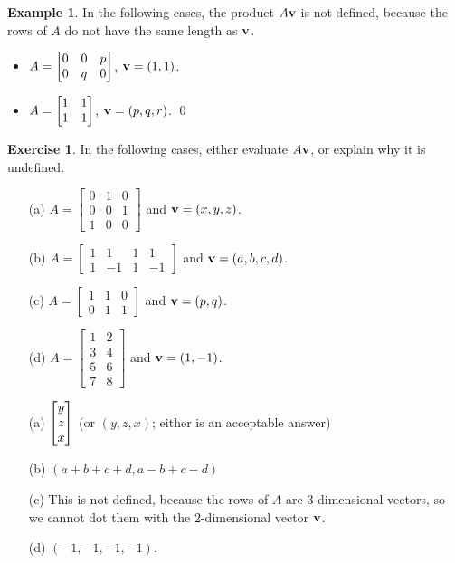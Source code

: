 \documentclass[a4paper]{book}
\theoremstyle{definition}
\newtheorem{example}[theorem]{Example}
\newtheorem{exercise}[theorem]{Exercise}
\renewenvironment{solution}{\SolutionInline}{\endSolutionInline}
\begin{document}
\begin{example}
 In the following cases, the product $A\mathbf{v}$ is not defined,
 because the rows of $A$ do not have the same length as $\mathbf{v}$.
 \begin{itemize}
  \item $A=\begin{bmatrix} 0&0&p \\ 0&q&0 \end{bmatrix}$,
    $\mathbf{v}=(1,1)$.
  \item $A=\begin{bmatrix} 1&1 \\ 1&1 \end{bmatrix}$,
    $\mathbf{v}=(p,q,r)$. \qed
 \end{itemize}
\end{example}
\begin{exercise}
 In the following cases, either evaluate $A\mathbf{v}$, or explain why it
 is undefined.
 \begin{itemize}
  \item[(a)] 
   $A = \begin{bmatrix} 0&1&0 \\ 0&0&1 \\ 1&0&0 \end{bmatrix}$ and 
   $\mathbf{v}=(x,y,z)$.
  \item[(b)] 
   $A = \begin{bmatrix} 1&1&1&1 \\ 1&-1&1&-1 \end{bmatrix}$ and 
   $\mathbf{v}=(a,b,c,d)$.
  \item[(c)] 
   $A = \begin{bmatrix} 1&1&0 \\ 0&1&1 \end{bmatrix}$ and 
   $\mathbf{v}=(p,q)$.
  \item[(d)] 
   $A = \begin{bmatrix} 1&2 \\ 3&4 \\ 5&6 \\ 7&8 \end{bmatrix}$ and 
   $\mathbf{v}=(1,-1)$.
 \end{itemize}
\end{exercise}
\begin{solution}
 \begin{itemize}
  \item[(a)] $\begin{bmatrix} y\\ z\\ x\end{bmatrix}$ (or $(y,z,x)$; 
   either is an acceptable answer)
  \item[(b)] $(a+b+c+d,a-b+c-d)$
  \item[(c)] This is not defined, because the rows of $A$ are
   $3$-dimensional vectors, so we cannot dot them with the
   $2$-dimensional vector $\mathbf{v}$.
  \item[(d)] $(-1,-1,-1,-1)$.
 \end{itemize}
\end{solution}
\end{document}
